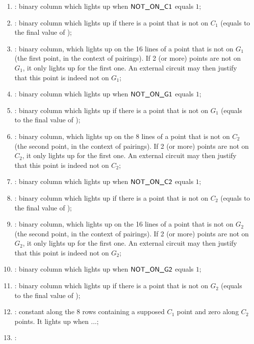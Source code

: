 \begin{enumerate}[resume]
      \item \notOnCOneAcc: binary column which lights up when $\textsf{NOT\_ON\_C1}$ equals $1$;
      \item \notOnCOneAccMax: binary column which lights up if there is a point that is not on $C_1$ (equals to the final value of \notOnCOneAcc);
      \item \notOnGOne{ }\blsPrediction{}: binary column, which lights up on the 16 lines of a point that is not on $G_1$ (the first point, in the context of pairings). If 2 (or more) points are not on $G_1$, it only lights up for the first one. An external circuit may then justify that this point is indeed not on $G_1$;
      \item \notOnGOneAcc: binary column which lights up when $\textsf{NOT\_ON\_G1}$ equals $1$;
      \item \notOnGOneAccMax: binary column which lights up if there is a point that is not on $G_1$ (equals to the final value of \notOnGOneAcc);
      \item \notOnCTwo{} \blsPrediction{}: binary column, which lights up on the 8 lines of a point that is not on $C_2$ (the second point, in the context of pairings). If 2 (or more) points are not on $C_2$, it only lights up for the first one. An external circuit may then justify that this point is indeed not on $C_2$;       
      \item \notOnCTwoAcc: binary column which lights up when $\textsf{NOT\_ON\_C2}$ equals $1$;    
      \item \notOnCTwoAccMax: binary column which lights up if there is a point that is not on $C_2$ (equals to the final value of \notOnCTwoAcc);
      \item \notOnGTwo{} \blsPrediction{}: binary column, which lights up on the 16 lines of a point that is not on $G_2$ (the second point, in the context of pairings). If 2 (or more) points are not on $G_2$, it only lights up for the first one. An external circuit may then justify that this point is indeed not on $G_2$;
      \item \notOnGTwoAcc: binary column which lights up when $\textsf{NOT\_ON\_G2}$ equals $1$;
      \item \notOnGTwoAccMax: binary column which lights up if there is a point that is not on $G_2$ (equals to the final value of \notOnGTwoAcc);
      \item \both{\cOneMembershipTestRequired}:
            constant along the 8 rows containing a supposed $C_1$ point and zero along $C_2$ points. It lights up when ...;
      \item \both{\gOneMembershipTestRequired}:

\end{enumerate}
